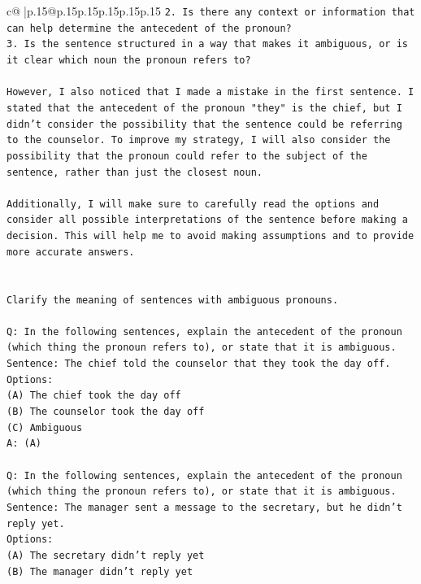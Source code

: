 \documentclass{article}
\begin{document}
{\begin{supertabular}{c@{$\;$}|p{.15\linewidth}@{}p{.15\linewidth}p{.15\linewidth}p{.15\linewidth}p{.15\linewidth}p{.15\linewidth}}
{{{\texttt{2. Is there any context or information that can help determine the antecedent of the pronoun?} \\
\texttt{3. Is the sentence structured in a way that makes it ambiguous, or is it clear which noun the pronoun refers to?} \\
\\ 
\texttt{However, I also noticed that I made a mistake in the first sentence. I stated that the antecedent of the pronoun "they" is the chief, but I didn't consider the possibility that the sentence could be referring to the counselor. To improve my strategy, I will also consider the possibility that the pronoun could refer to the subject of the sentence, rather than just the closest noun.} \\
\\ 
\texttt{Additionally, I will make sure to carefully read the options and consider all possible interpretations of the sentence before making a decision. This will help me to avoid making assumptions and to provide more accurate answers.} \\
\\ 
\\ 
\texttt{Clarify the meaning of sentences with ambiguous pronouns.} \\
\\ 
\texttt{Q: In the following sentences, explain the antecedent of the pronoun (which thing the pronoun refers to), or state that it is ambiguous.} \\
\texttt{Sentence: The chief told the counselor that they took the day off.} \\
\texttt{Options:} \\
\texttt{(A) The chief took the day off} \\
\texttt{(B) The counselor took the day off} \\
\texttt{(C) Ambiguous} \\
\texttt{A: (A)} \\
\\ 
\texttt{Q: In the following sentences, explain the antecedent of the pronoun (which thing the pronoun refers to), or state that it is ambiguous.} \\
\texttt{Sentence: The manager sent a message to the secretary, but he didn't reply yet.} \\
\texttt{Options:} \\
\texttt{(A) The secretary didn't reply yet} \\
\texttt{(B) The manager didn't reply yet} \\
}}}
\end{supertabular}}
\end{document}
